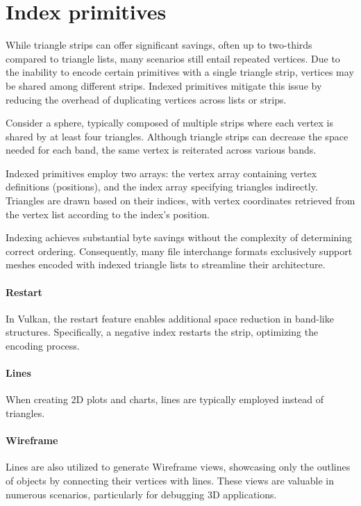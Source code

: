 \section{Index primitives}

While triangle strips can offer significant savings, often up to two-thirds compared to triangle lists, many scenarios still entail repeated vertices. 
Due to the inability to encode certain primitives with a single triangle strip, vertices may be shared among different strips. 
Indexed primitives mitigate this issue by reducing the overhead of duplicating vertices across lists or strips.

Consider a sphere, typically composed of multiple strips where each vertex is shared by at least four triangles. 
Although triangle strips can decrease the space needed for each band, the same vertex is reiterated across various bands.

Indexed primitives employ two arrays: the vertex array containing vertex definitions (positions), and the index array specifying triangles indirectly. 
Triangles are drawn based on their indices, with vertex coordinates retrieved from the vertex list according to the index's position.

Indexing achieves substantial byte savings without the complexity of determining correct ordering. 
Consequently, many file interchange formats exclusively support meshes encoded with indexed triangle lists to streamline their architecture.

\paragraph*{Restart}
In Vulkan, the restart feature enables additional space reduction in band-like structures. 
Specifically, a negative index restarts the strip, optimizing the encoding process.

\paragraph*{Lines}
When creating 2D plots and charts, lines are typically employed instead of triangles.

\paragraph*{Wireframe}
Lines are also utilized to generate Wireframe views, showcasing only the outlines of objects by connecting their vertices with lines. 
These views are valuable in numerous scenarios, particularly for debugging 3D applications.


